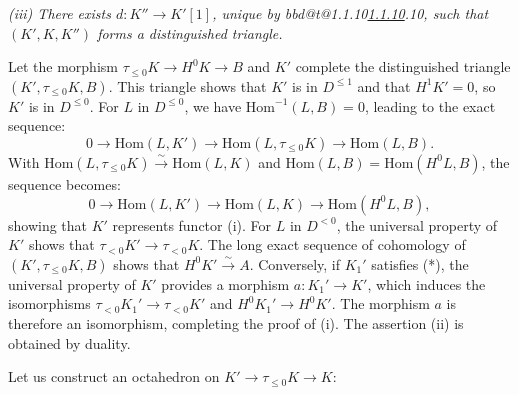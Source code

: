 \documentclass[12pt,oneside]{amsbook}
\makeatletter
\DeclareRobustCommand{\rn}[1]{%
  \ifcsname bbd@t@#1\endcsname\hyperlink{bbd:#1}{#1}\else#1\fi}
\theoremstyle{plain}
\theoremstyle{definition}
\makeatother
\begin{document}
\emph{(iii) There exists \(d : K'' \to K'[1]\), unique by \rn{1.1.10}, such that \((K', K, K'')\) forms a distinguished triangle.}

Let the morphism \(\tau_{\le 0} K \to H^0 K \to B\) and \(K'\) complete the distinguished triangle \((K', \tau_{\le 0} K, B)\). This triangle shows that \(K'\) is in \(D^{\leq 1}\) and that \(H^1 K' = 0\), so \(K'\) is in \(D^{\le 0}\). For \(L\) in \(D^{\le 0}\), we have \(\mathrm{Hom}^{-1}(L, B) = 0\), leading to the exact sequence:
\[
0 \to \mathrm{Hom}(L, K') \to \mathrm{Hom}(L, \tau_{\le 0} K) \to \mathrm{Hom}(L, B).
\]
With \(\mathrm{Hom}(L, \tau_{\le 0} K) \overset{\sim}\to \mathrm{Hom}(L, K)\) and \(\mathrm{Hom}(L, B) = \mathrm{Hom}(H^0 L, B)\), the sequence becomes:
\[
0 \to \mathrm{Hom}(L, K') \to \mathrm{Hom}(L, K) \to \mathrm{Hom}(H^0 L, B),
\]
showing that \(K'\) represents functor (i). For \(L\) in \(D^{<0}\), the universal property of \(K'\) shows that \(\tau_{<0} K' \to \tau_{<0} K\). The long exact sequence of cohomology of \((K', \tau_{\le 0} K, B)\) shows that \(H^0 K'\overset{\sim} \to A\). Conversely, if \(K_1'\) satisfies (*), the universal property of \(K'\) provides a morphism \(a : K_1' \to K'\), which induces the isomorphisms \(\tau_{<0} K_1' \to \tau_{<0} K'\) and \(H^0 K_1' \to H^0 K'\). The morphism \(a\) is therefore an isomorphism, completing the proof of (i). The assertion (ii) is obtained by duality.

Let us construct an octahedron on \(K' \to \tau_{\le 0} K \to K\):

\begin{center}\begin{minipage}{0.45\textwidth}
\centering
{}
\end{minipage}
\end{center}
\end{document}
